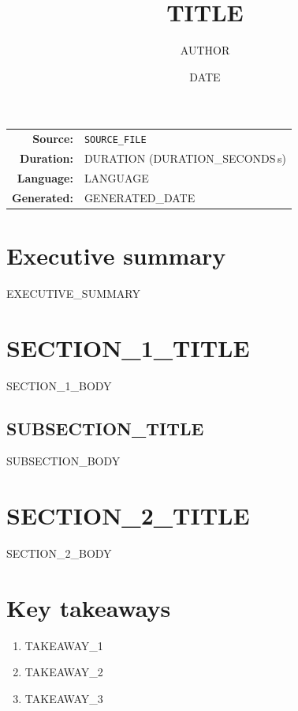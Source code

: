 \documentclass[11pt,a4paper]{article}
\title{{{TITLE}}}
\author{{{AUTHOR}}}
\date{{{DATE}}}
\begin{document}
\maketitle

\begin{center}
\begin{tabular}{rl}
  \textbf{Source:} & \texttt{{{SOURCE_FILE}}} \\
  \textbf{Duration:} & {{DURATION}} ({{DURATION_SECONDS}}\,s) \\
  \textbf{Language:} & {{LANGUAGE}} \\
  \textbf{Generated:} & {{GENERATED_DATE}} \\
\end{tabular}
\end{center}

\tableofcontents
\newpage

\section*{Executive summary}
{{EXECUTIVE_SUMMARY}}

\section{{{SECTION_1_TITLE}}}
{{SECTION_1_BODY}}

\subsection{{{SUBSECTION_TITLE}}}
{{SUBSECTION_BODY}}

\section{{{SECTION_2_TITLE}}}
{{SECTION_2_BODY}}

\section{Key takeaways}
\begin{enumerate}
  \item {{TAKEAWAY_1}}
  \item {{TAKEAWAY_2}}
  \item {{TAKEAWAY_3}}
\end{enumerate}
\end{document}
